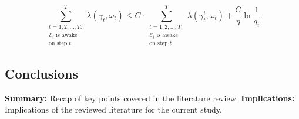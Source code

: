 \begin{equation}
    \overset{T}{\underset{\substack{t=1,2,\ldots,T:\\\mathcal{E}_i\text{ is awake}\\\text{on step }t}}{\sum}}\lambda(\gamma_t, \omega_t) \leq C \cdot \overset{T}{\underset{\substack{t=1,2,\ldots,T:\\\mathcal{E}_i\text{ is awake}\\\text{on step }t}}{\sum}} \lambda(\gamma^i_t, \omega_t) + \frac{C}{\eta}\ln\frac{1}{q_i} 
\end{equation}

\subsection{Conclusions}
\textbf{Summary:} Recap of key points covered in the literature review.\newline
\textbf{Implications:} Implications of the reviewed literature for the current study.\newline